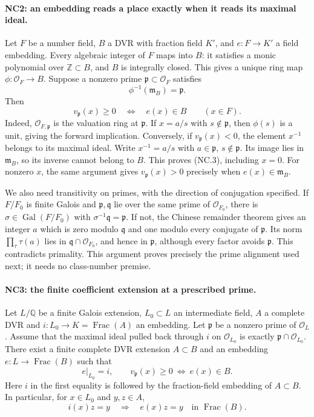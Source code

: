 \paragraph{NC2: an embedding reads a place exactly when it reads its maximal ideal.}
Let \(F\) be a number field, \(B\) a DVR with fraction field \(K'\),
and \(e:F\longrightarrow K'\) a field embedding.
Every algebraic integer of \(F\) maps into \(B\): it satisfies a
monic polynomial over \(\mathbb Z\subset B\), and \(B\) is
integrally closed. This gives a unique ring map
\(\phi:\mathcal O_F\longrightarrow B\).
Suppose a nonzero prime \(\mathfrak p\subset\mathcal O_F\)
satisfies
\[
 \phi^{-1}(\mathfrak m_B)=\mathfrak p.
 \tag{NC.2}
\]
Then
\[
 v_{\mathfrak p}(x)\geq0
 \quad\Longleftrightarrow\quad e(x)\in B
 \qquad(x\in F).
 \tag{NC.3}
\]
Indeed, \(\mathcal O_{F,\mathfrak p}\) is the valuation ring at
\(\mathfrak p\). If \(x=a/s\) with \(s\notin\mathfrak p\),
then \(\phi(s)\) is a unit, giving the forward implication.
Conversely, if \(v_{\mathfrak p}(x)<0\), the element \(x^{-1}\)
belongs to its maximal ideal. Write \(x^{-1}=a/s\) with
\(a\in\mathfrak p\), \(s\notin\mathfrak p\).
Its image lies in \(\mathfrak m_B\), so its inverse cannot
belong to \(B\). This proves (NC.3), including \(x=0\).
For nonzero \(x\), the same argument gives
\(v_{\mathfrak p}(x)>0\) precisely when \(e(x)\in\mathfrak m_B\).

We also need transitivity on primes, with the direction of
conjugation specified. If \(F/F_0\) is finite Galois and
\(\mathfrak p,\mathfrak q\) lie over the same prime of
\(\mathcal O_{F_0}\), there is
\(\sigma\in\operatorname{Gal}(F/F_0)\) with
\(\sigma^{-1}\mathfrak q=\mathfrak p\).
If not, the Chinese remainder theorem gives an integer \(a\)
which is zero modulo \(\mathfrak q\) and one modulo every
conjugate of \(\mathfrak p\). Its norm
\(\prod_\tau\tau(a)\) lies in
\(\mathfrak q\cap\mathcal O_{F_0}\), and hence in
\(\mathfrak p\), although every factor avoids \(\mathfrak p\).
This contradicts primality. This argument proves precisely
the prime alignment used next; it needs no class-number premise.

\paragraph{NC3: the finite coefficient extension at a prescribed prime.}
Let \(L/\mathbb Q\) be a finite Galois extension, \(L_0\subset L\)
an intermediate field, \(A\) a complete DVR and
\(i:L_0\longrightarrow K=\operatorname{Frac}(A)\) an embedding.
Let \(\mathfrak p\) be a nonzero prime of \(\mathcal O_L\).
Assume that the maximal ideal pulled back through \(i\) on
\(\mathcal O_{L_0}\) is exactly
\(\mathfrak p\cap\mathcal O_{L_0}\).
There exist a finite complete DVR extension \(A\subset B\)
and an embedding \(e:L\longrightarrow\operatorname{Frac}(B)\)
such that
\[
 e|_{L_0}=i,\qquad
 v_{\mathfrak p}(x)\geq0\ \Longleftrightarrow\ e(x)\in B.
 \tag{NC.4}
\]
Here \(i\) in the first equality is followed by the fraction-field
embedding of \(A\subset B\). In particular, for \(x\in L_0\)
and \(y,z\in A\),
\[
 i(x)z=y\quad\Longrightarrow\quad e(x)z=y
 \quad\text{in }\operatorname{Frac}(B).
 \tag{NC.5}
\]

